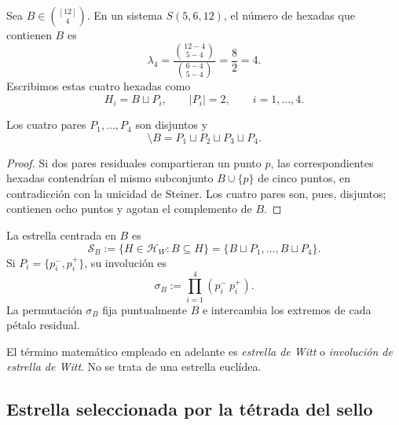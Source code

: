 Sea \(B\in\binom{[12]}4\). En un sistema \(S(5,6,12)\), el número de
hexadas que contienen \(B\) es
\begin{equation}
 \lambda_4
 =\frac{\binom{12-4}{5-4}}{\binom{6-4}{5-4}}
 =\frac82=4.
 \label{p12-83-c20-s2:eq:lambda-cuatro-w12}
\end{equation}
Escribimos estas cuatro hexadas como
\[
 H_i=B\sqcup P_i,
 \qquad |P_i|=2,
 \qquad i=1,\ldots,4.
\]

\begin{lemma}
\label{p12-83-c20-s2:lem:particion-residual-tetrada-witt}
Los cuatro pares \(P_1,\ldots,P_4\) son disjuntos y
\begin{equation}
 [12]\setminus B
 =P_1\sqcup P_2\sqcup P_3\sqcup P_4.
 \label{p12-83-c20-s2:eq:particion-residual-tetrada-witt}
\end{equation}
\end{lemma}

\begin{proof}
Si dos pares residuales compartieran un punto \(p\), las correspondientes
hexadas contendrían el mismo subconjunto \(B\cup\{p\}\) de cinco puntos,
en contradicción con la unicidad de Steiner. Los cuatro pares son, pues,
disjuntos; contienen ocho puntos y agotan el complemento de \(B\).
\end{proof}

\begin{definition}
\label{p12-83-c20-s2:def:estrella-witt-involucion}
La estrella centrada en \(B\) es
\begin{equation}
 \mathscr S_B
 :=\{H\in\mathcal H_W:B\subseteq H\}
 =\{B\sqcup P_1,\ldots,B\sqcup P_4\}.
 \label{p12-83-c20-s2:eq:estrella-witt-general}
\end{equation}
Si \(P_i=\{p_i^-,p_i^+\}\), su involución es
\begin{equation}
 \sigma_B:=\prod_{i=1}^{4}(p_i^-\ p_i^+).
 \label{p12-83-c20-s2:eq:involucion-estrella-witt-general}
\end{equation}
La permutación \(\sigma_B\) fija puntualmente \(B\) e intercambia los
extremos de cada pétalo residual.
\end{definition}

El término matemático empleado en adelante es \emph{estrella de Witt} o
\emph{involución de estrella de Witt}. No se trata de una estrella
euclídea.

\subsection{Estrella seleccionada por la tétrada del sello}

